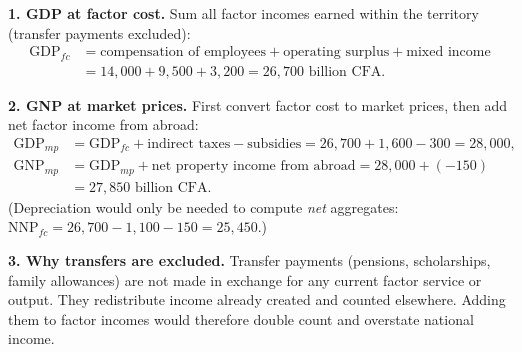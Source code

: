 \documentclass[11pt]{article}
\newcommand{\cle}[1]{{\popxbold\color{popdark}#1}}
\begin{document}
\begin{corrige}
\textbf{1. GDP at factor cost.} Sum all factor incomes earned within the territory (transfer payments excluded):
\begin{align*}
\mathrm{GDP}_{fc} &= \text{compensation of employees} + \text{operating surplus} + \text{mixed income}\\
&= 14{,}000 + 9{,}500 + 3{,}200 = \boxed{26{,}700 \text{ billion CFA}}.
\end{align*}

\textbf{2. GNP at market prices.} First convert factor cost to market prices, then add net factor income from abroad:
\begin{align*}
\mathrm{GDP}_{mp} &= \mathrm{GDP}_{fc} + \text{indirect taxes} - \text{subsidies} = 26{,}700 + 1{,}600 - 300 = 28{,}000,\\
\mathrm{GNP}_{mp} &= \mathrm{GDP}_{mp} + \text{net property income from abroad} = 28{,}000 + (-150)\\
&= \boxed{27{,}850 \text{ billion CFA}}.
\end{align*}
(Depreciation would only be needed to compute \emph{net} aggregates: $\mathrm{NNP}_{fc} = 26{,}700 - 1{,}100 - 150 = 25{,}450$.)

\textbf{3. Why transfers are excluded.} \cle{Transfer payments} (pensions, scholarships, family allowances) are not made in exchange for any current factor service or output. They redistribute income already created and counted elsewhere. Adding them to factor incomes would therefore double count and overstate national income.
\end{corrige}
\end{document}
